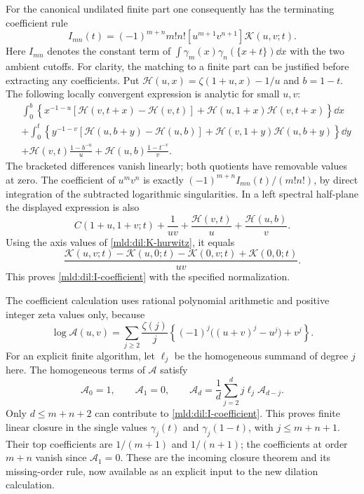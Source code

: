 For the canonical undilated finite part one consequently has the
terminating coefficient rule
\begin{equation}
 \boxed{I_{mn}(t)=(-1)^{m+n}m!n!
       [u^{m+1}v^{n+1}]\mathcal K(u,v;t).}
 \label{mld:dil:I-coefficient}
\end{equation}
Here $I_{mn}$ denotes the constant term of
$\int\gamma_m(x)\gamma_n(\{x+t\})\dd x$ with the two ambient cutoffs.
For clarity, the matching to a finite part can be justified before
extracting any coefficients. Put
$\mathcal H(u,x)=\zeta(1+u,x)-1/u$ and $b=1-t$.
The following locally convergent expression is analytic for small $u,v$:
\begin{align*}
 &\int_0^b\left\{
 x^{-1-u}[\mathcal H(v,t+x)-\mathcal H(v,t)]
       +\mathcal H(u,1+x)\mathcal H(v,t+x)\right\}\dd x\\
 &+\int_0^t\left\{
 y^{-1-v}[\mathcal H(u,b+y)-\mathcal H(u,b)]
       +\mathcal H(v,1+y)\mathcal H(u,b+y)\right\}\dd y\\
 &+\mathcal H(v,t)\frac{1-b^{-u}}u
       +\mathcal H(u,b)\frac{1-t^{-v}}v.
\end{align*}
The bracketed differences vanish linearly; both quotients have removable
values at zero. The coefficient of $u^mv^n$ is exactly
$(-1)^{m+n}I_{mn}(t)/(m!n!)$, by direct integration of the subtracted
logarithmic singularities. In a left spectral half-plane the displayed
expression is also
\[
 C(1+u,1+v;t)+\frac1{uv}
       +\frac{\mathcal H(v,t)}u+\frac{\mathcal H(u,b)}v.
\]
Using the axis values of \eqref{mld:dil:K-hurwitz}, it equals
\[
 \frac{\mathcal K(u,v;t)-\mathcal K(u,0;t)
            -\mathcal K(0,v;t)+\mathcal K(0,0;t)}{uv}.
\]
This proves \eqref{mld:dil:I-coefficient} with the specified normalization.

The coefficient calculation uses rational polynomial arithmetic and
positive integer zeta values only, because
\begin{equation}
 \log\mathcal A(u,v)=\sum_{j\ge2}\frac{\zeta(j)}j
       \left\{(-1)^j\bigl((u+v)^j-u^j\bigr)+v^j\right\}.
 \label{mld:dil:logA}
\end{equation}
For an explicit finite algorithm, let $\ell_j$ be the homogeneous summand
of degree $j$ here. The homogeneous terms of $\mathcal A$ satisfy
\[
 \mathcal A_0=1,\qquad\mathcal A_1=0,\qquad
 \mathcal A_d=\frac1d\sum_{j=2}^d j\ell_j\mathcal A_{d-j}.
\]
Only $d\le m+n+2$ can contribute to \eqref{mld:dil:I-coefficient}. This proves
finite linear closure in the single values $\gamma_j(t)$ and
$\gamma_j(1-t)$, with $j\le m+n+1$. Their top coefficients are
$1/(m+1)$ and $1/(n+1)$; the coefficients at order $m+n$ vanish since
$\mathcal A_1=0$. These are the incoming closure theorem and its
missing-order rule, now available as an explicit input to the new
dilation calculation.


